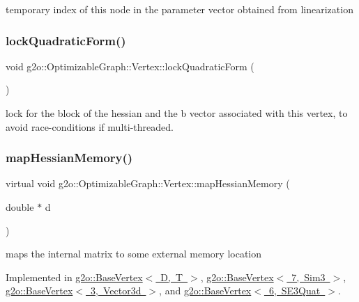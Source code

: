 temporary index of this node in the parameter vector obtained from linearization 

\mbox{\label{classg2o_1_1_optimizable_graph_1_1_vertex_a2eb3dbe08fd20ca8feeeaecc63ce240c}} 
\subsubsection{\texorpdfstring{lock\+Quadratic\+Form()}{lockQuadraticForm()}}
{\footnotesize\ttfamily void g2o\+::\+Optimizable\+Graph\+::\+Vertex\+::lock\+Quadratic\+Form (\begin{DoxyParamCaption}{ }\end{DoxyParamCaption})\hspace{0.3cm}{\ttfamily [inline]}}

lock for the block of the hessian and the b vector associated with this vertex, to avoid race-\/conditions if multi-\/threaded. \mbox{\label{classg2o_1_1_optimizable_graph_1_1_vertex_a1008c0f7981a9fb11be3e3df5c4a9758}} 
\subsubsection{\texorpdfstring{map\+Hessian\+Memory()}{mapHessianMemory()}}
{\footnotesize\ttfamily virtual void g2o\+::\+Optimizable\+Graph\+::\+Vertex\+::map\+Hessian\+Memory (\begin{DoxyParamCaption}\item[{double $\ast$}]{d }\end{DoxyParamCaption})\hspace{0.3cm}{\ttfamily [pure virtual]}}

maps the internal matrix to some external memory location 

Implemented in \mbox{\hyperlink{classg2o_1_1_base_vertex_a54227ac315e6bc75c63ed117a2c75668}{g2o\+::\+Base\+Vertex$<$ D, T $>$}}, \mbox{\hyperlink{classg2o_1_1_base_vertex_a54227ac315e6bc75c63ed117a2c75668}{g2o\+::\+Base\+Vertex$<$ 7, Sim3 $>$}}, \mbox{\hyperlink{classg2o_1_1_base_vertex_a54227ac315e6bc75c63ed117a2c75668}{g2o\+::\+Base\+Vertex$<$ 3, Vector3d $>$}}, and \mbox{\hyperlink{classg2o_1_1_base_vertex_a54227ac315e6bc75c63ed117a2c75668}{g2o\+::\+Base\+Vertex$<$ 6, S\+E3\+Quat $>$}}.

